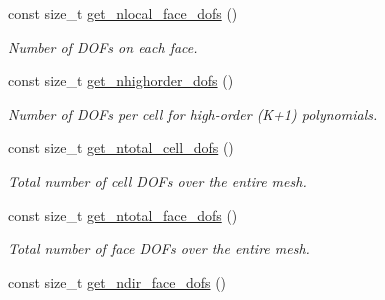 \begin{DoxyCompactItemize}
\mbox{\label{classHArDCore3D_1_1HHO__LocVarDiff_a50183dd5315faafad99f94c33b3b297e}} 
const size\+\_\+t \hyperlink{classHArDCore3D_1_1HHO__LocVarDiff_a50183dd5315faafad99f94c33b3b297e}{get\+\_\+nlocal\+\_\+face\+\_\+dofs} ()
\begin{DoxyCompactList}\small\item\em Number of D\+O\+Fs on each face. \end{DoxyCompactList}\item 
\mbox{\label{classHArDCore3D_1_1HHO__LocVarDiff_a745621585c09932f84dc01096997eabb}} 
const size\+\_\+t \hyperlink{classHArDCore3D_1_1HHO__LocVarDiff_a745621585c09932f84dc01096997eabb}{get\+\_\+nhighorder\+\_\+dofs} ()
\begin{DoxyCompactList}\small\item\em Number of D\+O\+Fs per cell for high-\/order (K+1) polynomials. \end{DoxyCompactList}\item 
\mbox{\label{classHArDCore3D_1_1HHO__LocVarDiff_a77c2a80e682212997d23d60712d5391e}} 
const size\+\_\+t \hyperlink{classHArDCore3D_1_1HHO__LocVarDiff_a77c2a80e682212997d23d60712d5391e}{get\+\_\+ntotal\+\_\+cell\+\_\+dofs} ()
\begin{DoxyCompactList}\small\item\em Total number of cell D\+O\+Fs over the entire mesh. \end{DoxyCompactList}\item 
\mbox{\label{classHArDCore3D_1_1HHO__LocVarDiff_ae76d4ea3457115f301371430f49d8c8a}} 
const size\+\_\+t \hyperlink{classHArDCore3D_1_1HHO__LocVarDiff_ae76d4ea3457115f301371430f49d8c8a}{get\+\_\+ntotal\+\_\+face\+\_\+dofs} ()
\begin{DoxyCompactList}\small\item\em Total number of face D\+O\+Fs over the entire mesh. \end{DoxyCompactList}\item 
\mbox{\label{classHArDCore3D_1_1HHO__LocVarDiff_abfaa052588d0662fa9f2a2c771ae7229}} 
const size\+\_\+t \hyperlink{classHArDCore3D_1_1HHO__LocVarDiff_abfaa052588d0662fa9f2a2c771ae7229}{get\+\_\+ndir\+\_\+face\+\_\+dofs} ()

\end{DoxyCompactItemize}
